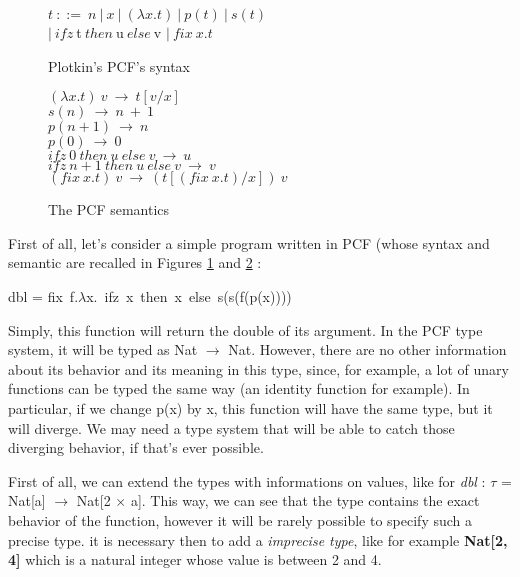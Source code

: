 \documentclass[a4paper,12pt]{report}
\begin{document}
\begin{figure}
  \begin{center}
    $t~::=~n~|~x~|~(\lambda x.t)~|~p(t)~|~s(t)$ \\
    $|~ifz~$t$~then~$u$~else~$v $|~fix~x.t$
  \end{center}
  \caption{Plotkin's PCF's syntax}
  \label{pcf-syntax}
\end{figure}

\begin{figure}
  \begin{center}
    $(\lambda x.t)~v~\rightarrow~ t[v/x]$ \\
    $s(n)~\rightarrow~ n~+~1$ \\
    $p(n+1)~\rightarrow~ n$ \\
    $p(0)~\rightarrow~ 0$ \\
    $ifz~0~then~u~else~v~\rightarrow~u$ \\
    $ifz~n+1~then~u~else~v~\rightarrow~v$ \\
    $(fix~x.t)~v~\rightarrow~(t[(fix~x.t)/x])~v$
  \end{center}
  \caption{The PCF semantics}
  \label{pcf-sem}
\end{figure}

First of all, let's consider a simple program written in PCF (whose syntax and
semantic are recalled in Figures \ref{pcf-syntax} and \ref{pcf-sem} :

\begin{center} 
  dbl = fix~f.$\lambda $x.~ifz~x~then~x~else~s(s(f(p(x)))) 
\end{center}

Simply, this function will return the double of its argument. In the PCF type
system, it will be typed as Nat $\rightarrow$ Nat. However, there are no other
information about its behavior and its meaning in this type, since, for example,
a lot of unary functions can be typed the same way (an identity function for
example). In particular, if we change p(x) by x, this function will have the
same type, but it will diverge. We may need a type system that will be able to
catch those diverging behavior, if that's ever possible.

First of all, we can extend the types with informations on values, like for
\emph{dbl} : $\tau$ = Nat[a] $\rightarrow$ Nat[2 $\times$ a]. This way, we can
see that the type contains the exact behavior of the function, however it will
be rarely possible to specify such a precise type. it is necessary then to add a
\emph{imprecise type}, like for example \textbf{Nat[2, 4]} which is a natural
integer whose value is between 2 and 4.
\end{document}
